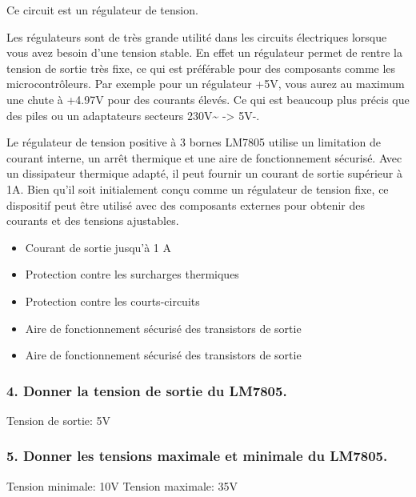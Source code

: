 \documentclass[french,a4paper,,tablecaptionabove]{scrartcl}
\providecommand{\tightlist}{%
  \setlength{\itemsep}{0pt}\setlength{\parskip}{0pt}}
\begin{document}
Ce circuit est un régulateur de tension.

Les régulateurs sont de très grande utilité dans les circuits
électriques lorsque vous avez besoin d'une tension stable. En effet un
régulateur permet de rentre la tension de sortie très fixe, ce qui est
préférable pour des composants comme les microcontrôleurs. Par exemple
pour un régulateur +5V, vous aurez au maximum une chute à +4.97V pour
des courants élevés. Ce qui est beaucoup plus précis que des piles ou un
adaptateurs secteurs 230V\textasciitilde{} -\textgreater{} 5V-.

Le régulateur de tension positive à 3 bornes LM7805 utilise un
limitation de courant interne, un arrêt thermique et une aire de
fonctionnement sécurisé. Avec un dissipateur thermique adapté, il peut
fournir un courant de sortie supérieur à 1A. Bien qu'il soit
initialement conçu comme un régulateur de tension fixe, ce dispositif
peut être utilisé avec des composants externes pour obtenir des courants
et des tensions ajustables.

\begin{itemize}
\tightlist
\item
  Courant de sortie jusqu'à 1 A
\item
  Protection contre les surcharges thermiques
\item
  Protection contre les courts-circuits
\item
  Aire de fonctionnement sécurisé des transistors de sortie
\item
  Aire de fonctionnement sécurisé des transistors de sortie
\end{itemize}

\hypertarget{donner-la-tension-de-sortie-du-lm7805.}{%
\subsubsection{4. Donner la tension de sortie du
LM7805.}\label{donner-la-tension-de-sortie-du-lm7805.}}

Tension de sortie: 5V

\hypertarget{donner-les-tensions-maximale-et-minimale-du-lm7805.}{%
\subsubsection{5. Donner les tensions maximale et minimale du
LM7805.}\label{donner-les-tensions-maximale-et-minimale-du-lm7805.}}

Tension minimale: 10V Tension maximale: 35V
\end{document}
